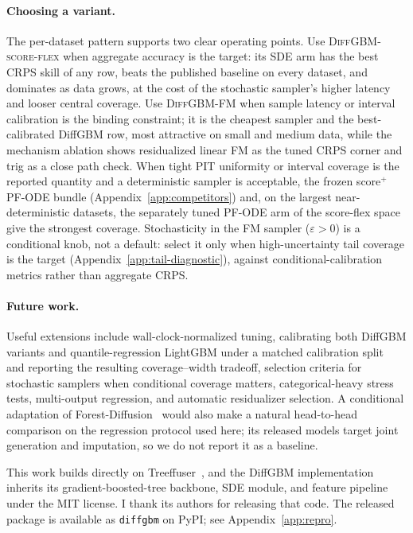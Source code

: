 \documentclass{article}
\begin{document}
\paragraph{Choosing a variant.} The per-dataset pattern supports two clear operating points. Use \textsc{DiffGBM-score-flex} when aggregate accuracy is the target: its SDE arm has the best CRPS skill of any row, beats the published baseline on every dataset, and dominates as data grows, at the cost of the stochastic sampler's higher latency and looser central coverage. Use \textsc{DiffGBM-FM} when sample latency or interval calibration is the binding constraint; it is the cheapest sampler and the best-calibrated DiffGBM row, most attractive on small and medium data, while the mechanism ablation shows residualized linear FM as the tuned CRPS corner and trig as a close path check. When tight PIT uniformity or interval coverage is the reported quantity and a deterministic sampler is acceptable, the frozen score$^+$ PF-ODE bundle (Appendix~\ref{app:competitors}) and, on the largest near-deterministic datasets, the separately tuned PF-ODE arm of the score-flex space give the strongest coverage. Stochasticity in the FM sampler ($\varepsilon>0$) is a conditional knob, not a default: select it only when high-uncertainty tail coverage is the target (Appendix~\ref{app:tail-diagnostic}), against conditional-calibration metrics rather than aggregate CRPS.

\paragraph{Future work.} Useful extensions include wall-clock-normalized tuning, calibrating both DiffGBM variants and quantile-regression LightGBM under a matched calibration split~\citep{romano2019cqr} and reporting the resulting coverage--width tradeoff, selection criteria for stochastic samplers when conditional coverage matters, categorical-heavy stress tests, multi-output regression, and automatic residualizer selection. A conditional adaptation of Forest-Diffusion~\citep{jolicoeurmartineau2024forest} would also make a natural head-to-head comparison on the regression protocol used here; its released models target joint generation and imputation, so we do not report it as a baseline.

\begin{ack}
This work builds directly on Treeffuser~\citep{treeffuser}, and the DiffGBM implementation inherits its gradient-boosted-tree backbone, SDE module, and feature pipeline under the MIT license. I thank its authors for releasing that code. The released package is available as \texttt{diffgbm} on PyPI; see Appendix~\ref{app:repro}.
\end{ack}
\end{document}
